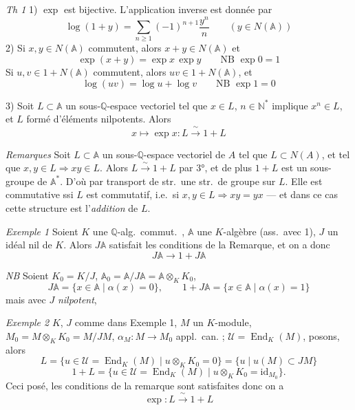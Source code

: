 \documentclass[11pt,a4paper]{article}
\begin{document}
\emph{Th 1} 1) $\exp$ est bijective. L'application inverse est donnée par
\[
\log(1+y) = \sum_{n \geq 1} (-1)^{n+1} \frac{y^n}{n} \qquad (y \in N(\mathbb{A}))
\]
2) Si $x, y \in N(\mathbb{A})$ commutent, alors $x + y \in N(\mathbb{A})$ et
\[
\exp(x+y) = \exp x \, \exp y \qquad \text{NB } \exp 0 = 1
\]
Si $u, v \in 1 + N(\mathbb{A})$ commutent, alors $uv \in 1 + N(\mathbb{A})$,
et
\[
\log(uv) = \log u + \log v \qquad \text{NB } \exp 1 = 0
\]

3) Soit $L \subset \mathbb{A}$ un sous-$\mathbb{Q}$-espace vectoriel tel que
$x \in L$, $n \in \mathbb{N}^{*}$ implique $x^n \in L$,  et $L$
formé d'éléments nilpotents. Alors
\[
x \mapsto \exp x : L \xrightarrow{\;\sim\;} 1 + L
\]

\emph{Remarques} Soit $L \subset \mathbb{A}$ un sous-$\mathbb{Q}$-espace
vectoriel de $A$  tel que
$L \subset N(A)$, et tel que $x, y \in L \Rightarrow xy \in L$. Alors
$L \xrightarrow{\sim} 1 + L$ par 3°, et de plus $1 + L$ est un sous-groupe de
$\mathbb{A}^{*}$. D'où par transport de str.\ une str.\ de groupe sur $L$.
Elle est commutative  ssi $L$ est commutatif, i.e.\ si
$x, y \in L \Rightarrow xy = yx$ — et dans ce cas cette structure est
l'\emph{addition} de $L$.

\emph{Exemple 1} Soient $K$ une $\mathbb{Q}$-alg.\ commut.\ \struck{\ill{}},
$\mathbb{A}$ une $K$-algèbre (ass.\ avec 1), $J$ un idéal nil de $K$. Alors
$J\mathbb{A}$ satisfait les conditions de la Remarque, et on a donc
\[
J\mathbb{A} \longrightarrow 1 + J\mathbb{A}
\]

\emph{NB} Soient $K_0 = K/J$,
$\mathbb{A}_0 = \mathbb{A}/J\mathbb{A} = \mathbb{A} \otimes_K K_0$,
\[
J\mathbb{A} = \{ x \in \mathbb{A} \mid \alpha(x) = 0 \}, \qquad
1 + J\mathbb{A} = \{ x \in \mathbb{A} \mid \alpha(x) = 1 \}
\]
mais avec $J$ \emph{nilpotent}, \ill{}

\emph{Exemple 2} $K$, $J$ comme dans Exemple 1, $M$ un $K$-module,
$M_0 = M \otimes_K K_0 = M/JM$, $\alpha_M : M \to M_0$ appl.\ can. ;
$\mathcal{U} = \operatorname{End}_K(M)$, \struck{\ill{}} posons, alors
\[
L = \{ u \in \mathcal{U} = \operatorname{End}_K(M) \mid u \otimes_K K_0 = 0 \} = \{ u \mid u(M) \subset JM \}
\]
\[
1 + L = \{ u \in \mathcal{U} = \operatorname{End}_K(M) \mid u \otimes_K K_0 = \mathrm{id}_{M_0} \}.
\]
Ceci posé, les conditions de la remarque sont satisfaites donc on a
\[
\exp : L \xrightarrow{\;\sim\;} 1 + L
\]
\end{document}
